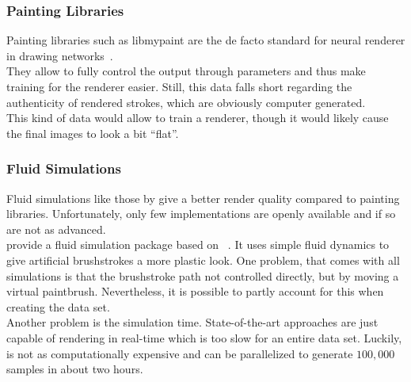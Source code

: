 \subsubsection{Painting Libraries}
Painting libraries such as libmypaint are the de facto standard for neural renderer in drawing networks~\cite{neuralpainters, learning2paint, strokenet}.\\
They allow to fully control the output through parameters and thus make training for the renderer easier.
Still, this data falls short regarding the authenticity of rendered strokes, which are obviously computer generated.\\
This kind of data would allow to train a renderer, though it would likely cause the final images to look a bit ``flat''.

\subsubsection{Fluid Simulations}
Fluid simulations like those by \citeauthor*{wetbrush} give a better render quality compared to painting libraries. 
Unfortunately, only few implementations are openly available and if so are not as advanced.\\
\citeauthor*{SPIRAL} provide a fluid simulation package based on ~\cite{fluidpaint}.
It uses simple fluid dynamics to give artificial brushstrokes a more plastic look.
One problem, that comes with all simulations is that the brushstroke path not controlled directly, but by moving a virtual paintbrush.
Nevertheless, it is possible to partly account for this when creating the data set.\\
Another problem is the simulation time.
State-of-the-art approaches are just capable of rendering in real-time which is too slow for an entire data set.
Luckily,  is not as computationally expensive and can be parallelized to generate $100,000$ samples in about two hours.


